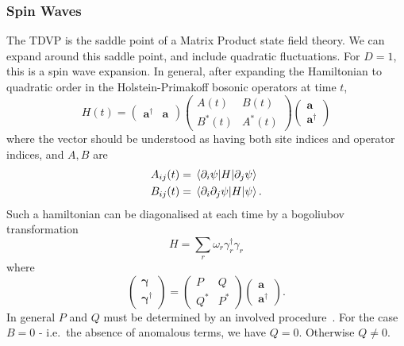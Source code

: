 \documentclass{article}
\let\vec\bm
\begin{document}
\subsubsection{Spin Waves}
%
The TDVP is the saddle point of a Matrix Product state field theory.
We can expand around this saddle point, and include quadratic fluctuations.
For $D=1$, this is a spin wave expansion.
In general, after expanding the Hamiltonian to quadratic order in the Holstein-Primakoff bosonic operators at time $t$, 
\begin{equation}
    H(t) = \begin{pmatrix} \vec{a}^\dagger & \vec{a} \end{pmatrix}
           \begin{pmatrix} A(t) & B(t) \\ B^*(t) & A^*(t) \end{pmatrix}
           \begin{pmatrix} \vec{a} \\ \vec{a}^\dagger \end{pmatrix}
\end{equation}
where the vector should be understood as having both site indices and operator indices, and $A, B$ are 
\begin{align}
    A_{ij}(t) &= \mel{\partial_i\psi}{H}{\partial_j\psi}\\
    B_{ij}(t) &= \mel{\partial_i\partial_j\psi}{H}{\psi}.
\end{align}
Such a hamiltonian can be diagonalised at each time by a bogoliubov transformation~\cite{colpa}
\begin{equation}
    H = \sum_r \omega_r \gamma_r^\dagger \gamma_r
\end{equation}
where
\begin{equation}
    \begin{pmatrix} \vec{\gamma}\\ \vec{\gamma}^\dagger \end{pmatrix}
    = \begin{pmatrix} P & Q \\ Q^* & P^* \end{pmatrix}
    \begin{pmatrix} \vec{a} \\ \vec{a}^\dagger \end{pmatrix}.
\end{equation}
In general $P$ and $Q$ must be determined by an involved procedure~\cite{colpa}.
For the case $B=0$ - i.e.\ the absence of anomalous terms, we have $Q=0$. 
Otherwise $Q \neq 0$.
\end{document}
